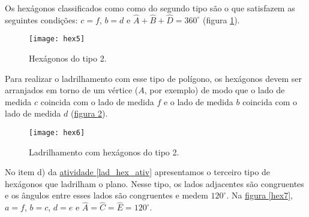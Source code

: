 Os hexágonos classificados como  como do segundo tipo são o que satisfazem as seguintes condições: $c= f$, $b=d$ e  $\hat{A} + \hat{B} + \hat{D} = 360^{\circ}$ (figura \ref{hex5}).

\begin{figure}[H]
\centering
\texttt{[image: hex5]}
\caption{Hexágonos do tipo 2.}
\label{hex5}
\end{figure}


Para realizar o ladrilhamento com esse tipo de polígono, os hexágonos devem ser arranjados em torno de um vértice ($A$, por exemplo)  de modo que o lado de medida $c$ coincida com o lado de medida $f$ e o lado de medida $b$ coincida com o lado de medida $d$ (\hyperref[hex6]{figura \ref{hex6}}).

\begin{figure}[H]
\centering
\texttt{[image: hex6]}
\caption{Ladrilhamento com hexágonos do tipo 2.}
\label{hex6}
\end{figure}

No item d) da \hyperref[lad_hex_ativ]{atividade \ref{lad_hex_ativ}} apresentamos o terceiro tipo de hexágonos que ladrilham o plano. Nesse tipo, os lados adjacentes são congruentes e os ângulos entre esses lados são congruentes e medem $120^{\circ}$. Na \hyperref[hex7]{figura \ref{hex7}}, $a=f$, $b=c$, $d=e$ e $\hat{A}=\hat{C}=\hat{E}= 120^{\circ}$.

\clearmargin

